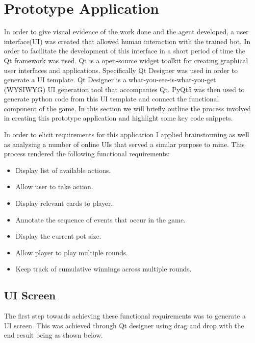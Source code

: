 \section{Prototype Application}\label{sec:prototypeApp}
In order to give visual evidence of the work done and the agent developed, a user interface(UI) was created
that allowed human interaction with the trained bot.
In order to facilitate the development of this interface in a short period of time the Qt framework was used.
Qt is a open-source widget toolkit for creating graphical user interfaces and applications.
Specifically Qt Designer was used in order to generate a UI template.
Qt Designer is a what-you-see-is-what-you-get (WYSIWYG) UI generation tool that accompanies Qt.
PyQt5 was then used to generate python code from this UI template and connect the functional component of the game.
In this section we will briefly outline the process involved in creating this prototype application
and highlight some key code snippets.

In order to elicit requirements for this application I applied brainstorming as well as analysing a number
of online UIs that served a similar purpose to mine.
This process rendered the following functional requirements:
\begin{itemize}
    \item Display list of available actions.
    \item Allow user to take action.
    \item Display relevant cards to player.
    \item Annotate the sequence of events that occur in the game.
    \item Display the current pot size.
    \item Allow player to play multiple rounds.
    \item Keep track of cumulative winnings across multiple rounds.
\end{itemize}

\subsection{UI Screen}\label{subsec:UiScreen}
The first step towards achieving these functional requirements was to generate a UI screen.
This was achieved through Qt designer using drag and drop with the end result being as shown below.

